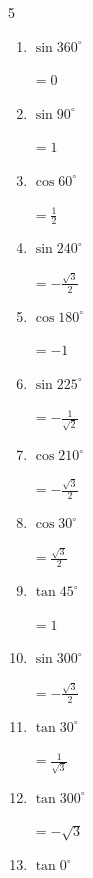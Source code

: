 \begin{multicols}{5}
\begin{enumerate}
        $\displaystyle =0$

  \item $\displaystyle \sin{360^\circ}$

        $\displaystyle =0$

  \item $\displaystyle \sin{90^\circ}$

        $\displaystyle =1$

  \item $\displaystyle \cos{60^\circ}$

        $\displaystyle =\frac{1}{2}$

  \item $\displaystyle \sin{240^\circ}$

        $\displaystyle =-\frac{\sqrt{3}}{2}$

  \item $\displaystyle \cos{180^\circ}$

        $\displaystyle =-1$

  \item $\displaystyle \sin{225^\circ}$

        $\displaystyle =-\frac{1}{\sqrt{2}}$

  \item $\displaystyle \cos{210^\circ}$

        $\displaystyle =-\frac{\sqrt{3}}{2}$

  \item $\displaystyle \cos{30^\circ}$

        $\displaystyle =\frac{\sqrt{3}}{2}$

  \item $\displaystyle \tan{45^\circ}$

        $\displaystyle =1$

  \item $\displaystyle \sin{300^\circ}$

        $\displaystyle =-\frac{\sqrt{3}}{2}$

  \item $\displaystyle \tan{30^\circ}$

        $\displaystyle =\frac{1}{\sqrt{3}}$

\columnbreak %

  \item $\displaystyle \tan{300^\circ}$

        $\displaystyle =-\sqrt{3}$

  \item $\displaystyle \tan{0^\circ}$


\end{enumerate}
\end{multicols}
